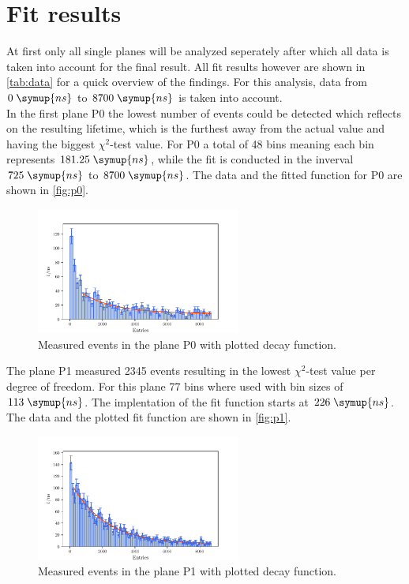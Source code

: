\section{Fit results}
At first only all single planes will be analyzed seperately after which all data is taken into account 
for the final result. All fit results however are shown in 
\autoref{tab:data} for a quick overview of the findings. For this analysis, data from $0 \; \symup{ns}$ to $8700 \; \symup{ns}$  is taken into account.\\
In the first plane P0 the lowest number of events could be detected which reflects on the resulting 
lifetime, which is the furthest away from the actual value and having the biggest $\chi^2$-test value.
For P0 a total of 48 bins meaning each 
bin represents $181.25 \; \symup{ns}$, while the fit is conducted in the inverval $725 \; \symup{ns}$ to $8700 \; \symup{ns}$.
The data and the fitted function for P0 are shown in \autoref{fig:p0}.\\
\begin{figure}
    \centering
    \includegraphics[width=0.6\textwidth]{plots/p0.pdf}
    \caption{Measured events in the plane P0 with plotted decay function.}
    \label{fig:p0}
\end{figure}
The plane P1 measured 2345 events resulting in the lowest $\chi^2$-test value per degree of freedom.
For this plane 77 bins where used with bin sizes of $113 \; \symup{ns}$. The implentation of 
the fit function starts at $226 \; \symup{ns}$. The data and the plotted fit function are shown in 
\autoref{fig:p1}.\\
\begin{figure}
    \centering
    \includegraphics[width=0.6\textwidth]{plots/p1.pdf}
    \caption{Measured events in the plane P1 with plotted decay function.}
    \label{fig:p1}
\end{figure}
